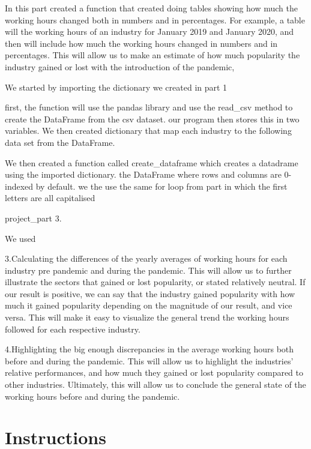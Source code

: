 \documentclass[fontsize=11pt]{article}
\begin{document}
In this part created a function that created doing tables showing how much the working hours changed both in numbers and in percentages. For example, a table will the working hours of an industry for January 2019 and January 2020, and then will include how much the working hours changed in numbers and in percentages. This will allow us to make an estimate of how much popularity the industry gained or lost with the introduction of the pandemic,

We started by importing the dictionary we created in part 1

first, the function will use the pandas library and use the read\_csv method to create the DataFrame from the csv dataset. our program then stores this in
two variables.
We then created dictionary that map each industry  to the following data set from the DataFrame.

We then created a function called create\_dataframe which creates a datadrame using the imported dictionary. the DataFrame where rows and columns are 0-indexed by default. we the use the same for loop from part in which the first letters are all capitalised



project\_part 3.

We used 
  
3.Calculating the differences of the yearly averages of working hours for each industry pre pandemic and during the pandemic. This will allow us to further illustrate the sectors that gained or lost popularity, or stated relatively neutral. If our result is positive, we can say that the industry gained popularity with how much it gained popularity depending on the magnitude of our result, and vice versa. This will make it easy to visualize the general trend the working hours followed for each respective industry.  
  
4.Highlighting the big enough discrepancies in the average working hours both before and during the pandemic. This will allow us to highlight the industries' relative performances, and how much they gained or lost popularity compared to other industries. Ultimately, this will allow us to conclude the general state of the working hours before and during the pandemic.  
  
  
  
\section*{Instructions} 
 
\end{document}
